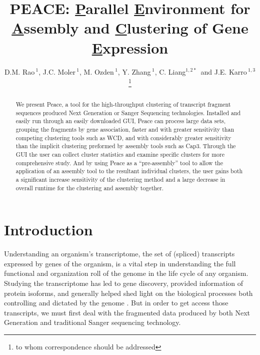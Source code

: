 \documentclass[a4,center,fleqn]{NAR}
\begin{document}
\title{PEACE: {\underline P}arallel {\underline E}nvironment for {\underline A}ssembly
  and {\underline C}lustering of Gene {\underline E}xpression}

\author{D.M. Rao\,$^{1}$, J.C. Moler\,$^{1}$, M. Ozden\,$^1$, Y. Zhang\,$^{1}$,
  C. Liang$^{1,2*}$\, and J.E. Karro\,$^{1,3}$\footnote{to whom
    correspondence should be addressed}}

\address{$^1$ Department of Computer Science and Software Engineering, \\
  $^2$ Department of Botany, \\
  $^3$ and Department of Microbiology, Miami University, Oxford, Ohio,
  USA}




\maketitle

\begin{abstract}
  We present {\sc Peace}, a tool for the high-throughput clustering of
  transcript fragment sequences produced Next Generation or Sanger
  Sequencing technologies.  Installed and easily run through an easily
  downloaded GUI, {\sc Peace} can process large data sets, grouping the
  fragments by gene association, faster and with greater sensitivity
  than competing clustering tools such as {\sc WCD}, and with
  considerably greater sensitivity than the implicit clustering
  preformed by assembly tools such as {\sc Cap3}.  Through the GUI the
  user can collect cluster statistics and examine specific
  clusters for more comprehensive study.  And by using {\sc Peace} as
  a ``pre-assembly'' tool to allow the application of an assembly tool
  to the resultant individual clusters, the user gains both a significant
  increase sensitivity of the clustering method and a large decrease
  in overall runtime for the clustering and assembly together.
\end{abstract}


\section{Introduction}

Understanding an organism's transcriptome, the set of (spliced)
transcripts expressed by genes of the organism, is a vital step in
understanding the full functional and organization roll of the genome
in the life cycle of any organism.  Studying the transcriptome has led
to gene discovery, provided information of protein isoforms, and
generally helped shed light on the biological processes both
controlling and dictated by the genome \cite{Nagaraj07}.  But in order
to get access those transcripts, we must first deal with the
fragmented data produced by both Next Generation and traditional
Sanger sequencing technology.
\end{document}

